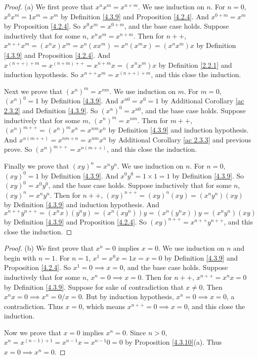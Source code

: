 \begin{proof}{(a)}
We first prove that \(x^n x^m = x^{n + m}\).
We use induction on \(n\).
For \(n = 0\), \(x^0 x^m = 1 x^m = x^m\) by Definition \ref{4.3.9} and Proposition \ref{4.2.4}.
And \(x^{0 + m} = x^m\) by Proposition \ref{4.2.4}.
So \(x^0 x^m = x^{0 + m}\), and the base case holds.
Suppose inductively that for some \(n\), \(x^n x^m = x^{n + m}\).
Then for \(n++\), \(x^{n++} x^m = (x^n x) x^m = x^n (x x^m) = x^n (x^m x) = (x^n x^m)x\) by Definition \ref{4.3.9} and Proposition \ref{4.2.4}.
And \(x^{(n++) + m} = x^{(n + m)++} = x^{n + m} x = (x^n x^m)x\) by Definition \ref{2.2.1} and induction hypothesis.
So \(x^{n++} x^m = x^{(n++) + m}\), and this close the induction.

Next we prove that \((x^n)^m = x^{nm}\).
We use induction on \(m\).
For \(m = 0\), \((x^n)^0 = 1\) by Definition \ref{4.3.9}.
And \(x^{n0} = x^0 = 1\) by Additional Corollary \ref{ac 2.3.2} and Definition \ref{4.3.9}.
So \((x^n)^0 = x^{n0}\), and the base case holds.
Suppose inductively that for some \(m\), \((x^n)^m = x^{nm}\).
Then for \(m++\), \((x^n)^{m++} = (x^n)^m x^n = x^{nm} x^n\) by Definition \ref{4.3.9} and induction hypothesis.
And \(x^{n(m++)} = x^{nm + n} = x^{nm} x^n\) by Additional Corollary \ref{ac 2.3.3} and previous prove.
So \((x^n)^{m++} = x^{n(m++)}\), and this close the induction.

Finally we prove that \((xy)^n = x^n y^n\).
We use induction on \(n\).
For \(n = 0\), \((xy)^0 = 1\) by Definition \ref{4.3.9}.
And \(x^0 y^0 = 1 \times 1 = 1\) by Definition \ref{4.3.9}.
So \((xy)^0 = x^0 y^0\), and the base case holds.
Suppose inductively that for some \(n\), \((xy)^n = x^n y^n\).
Then for \(n++\), \((xy)^{n++} = (xy)^n (xy) = (x^n y^n)(xy)\) by Definition \ref{4.3.9} and induction hypothesis.
And \(x^{n++} y^{n++} = (x^n x)(y^n y) = (x^n (x y^n))y = (x^n (y^n x))y = (x^n y^n)(xy)\) by Definition \ref{4.3.9} and Proposition \ref{4.2.4}.
So \((xy)^{n++} = x^{n++} y^{n++}\), and this close the induction.
\end{proof}

\begin{proof}{(b)}
We first prove that \(x^n = 0\) implies \(x = 0\).
We use induction on \(n\) and begin with \(n = 1\).
For \(n = 1\), \(x^1 = x^0 x = 1x = x = 0\) by Definition \ref{4.3.9} and Proposition \ref{4.2.4}.
So \(x^1 = 0 \implies x = 0\), and the base case holds.
Suppose inductively that for some \(n\), \(x^n = 0 \implies x = 0\).
Then for \(n++\), \(x^{n++} = x^n x = 0\) by Definition \ref{4.3.9}.
Suppose for sake of contradiction that \(x \neq 0\).
Then \(x^n x = 0 \implies x^n = 0 / x = 0\).
But by induction hypothesis, \(x^n = 0 \implies x = 0\), a contradiction.
Thus \(x = 0\), which means \(x^{n++} = 0 \implies x = 0\), and this close the induction.

Now we prove that \(x = 0\) implies \(x^n = 0\).
Since \(n > 0\), \(x^n = x^{(n - 1) + 1} = x^{n - 1} x = x^{n - 1} 0 = 0\) by Proposition \ref{4.3.10}(a).
Thus \(x = 0 \implies x^n = 0\).
\end{proof}

